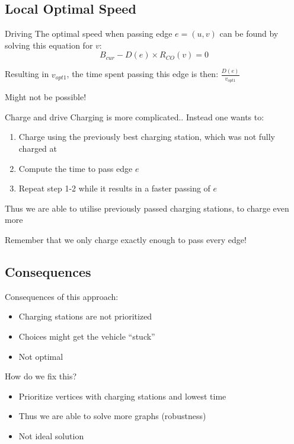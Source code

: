 \subsection{Local Optimal Speed}
\begin{frame}{Driving}
  The optimal speed when passing edge $e=(u,v)$ can be found by solving this equation for $v$:
  \[B_{cur} - D(e) \times R_{CO}(v)=0\]

  Resulting in $v_{opt1}$, the time spent passing this edge is then: $\frac{D(e)}{v_{opt1}}$

  Might not be possible!
\end{frame}
\begin{frame}{Charge and drive}
Charging is more complicated.. Instead one wants to:

\begin{enumerate}
    \item Charge using the previously best charging station, which was not fully charged at
    \item Compute the time to pass edge $e$
    \item Repeat step 1-2 while it results in a faster passing of $e$
  \end{enumerate}

  Thus we are able to utilise previously passed charging stations, to charge even more

  Remember that we only charge exactly enough to pass every edge!
\end{frame}

\subsection{Consequences}
\begin{frame}{Consequences of this approach:}
  \begin{itemize}
    \item Charging stations are not prioritized
    \item Choices might get the vehicle ``stuck''
    \item Not optimal
  \end{itemize}
  How do we fix this?
  \begin{itemize}
    \item Prioritize vertices with charging stations and lowest time
    \item Thus we are able to solve more graphs (robustness)
    \item Not ideal solution
  \end{itemize}
\end{frame}

